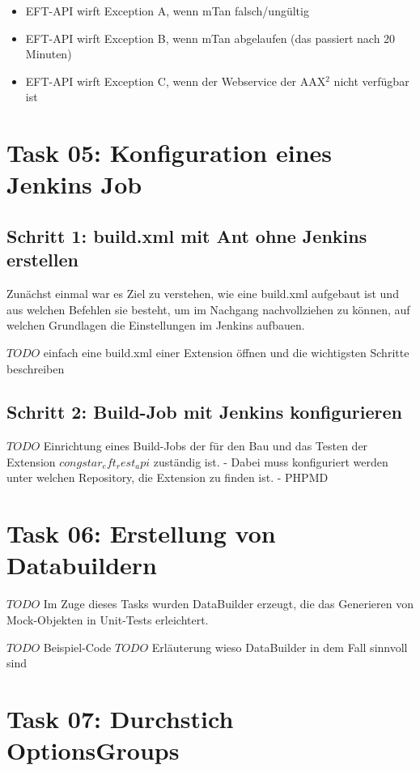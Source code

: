 \documentclass[11pt,a4paper]{article} %
\begin{document}
\begin{itemize}
	\item EFT-API wirft Exception A, wenn mTan falsch/ungültig
	\item EFT-API wirft Exception B, wenn mTan abgelaufen (das passiert nach 20 Minuten)
	\item EFT-API wirft Exception C, wenn der Webservice der AAX$^2$ nicht verfügbar ist
\end{itemize}



\section{Task 05: Konfiguration eines Jenkins Job}

\subsection{Schritt 1: build.xml mit Ant ohne Jenkins erstellen}
Zunächst einmal war es Ziel zu verstehen, wie eine build.xml aufgebaut ist
und aus welchen Befehlen sie besteht, um im Nachgang nachvollziehen zu können, auf welchen
Grundlagen die Einstellungen im Jenkins aufbauen.

$TODO$ einfach eine build.xml einer Extension öffnen und die wichtigsten Schritte beschreiben

\subsection{Schritt 2: Build-Job mit Jenkins konfigurieren}

$TODO$ Einrichtung eines Build-Jobs der für den Bau und das Testen
der Extension $congstar_eft_rest_api$ zuständig ist.
- Dabei muss konfiguriert werden unter welchen Repository, die Extension zu finden ist.
- PHPMD




\section{Task 06: Erstellung von Databuildern}

$TODO$ Im Zuge dieses Tasks wurden DataBuilder erzeugt, die das Generieren von Mock-Objekten in Unit-Tests erleichtert.

$TODO$ Beispiel-Code 
$TODO$ Erläuterung wieso DataBuilder in dem Fall sinnvoll sind




\section{Task 07: Durchstich OptionsGroups}
\end{document}
